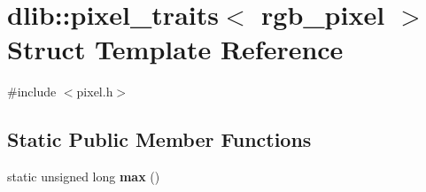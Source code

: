 \hypertarget{structdlib_1_1pixel__traits_3_01rgb__pixel_01_4}{
\section{dlib::pixel\_\-traits$<$ rgb\_\-pixel $>$ Struct Template Reference}
\label{structdlib_1_1pixel__traits_3_01rgb__pixel_01_4}
}


{\ttfamily \#include $<$pixel.h$>$}\subsection*{Static Public Member Functions}
\begin{DoxyCompactItemize}
\item 
\hypertarget{structdlib_1_1pixel__traits_3_01rgb__pixel_01_4_af3db9d5d63794f2fc947e7e9bc6315c7}{
static unsigned long {\bfseries max} ()}
\label{structdlib_1_1pixel__traits_3_01rgb__pixel_01_4_af3db9d5d63794f2fc947e7e9bc6315c7}

\end{DoxyCompactItemize}
